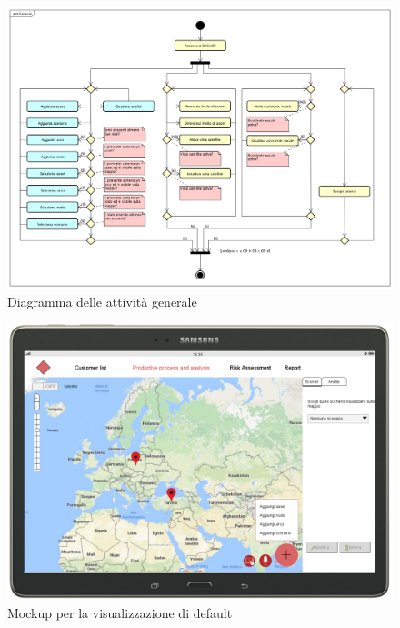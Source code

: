 \begin{figure}[H]
	\centering
	\includegraphics[width=\textwidth]{img/DiagrammiDiAttivita/GeneralActivities.png}
	\caption{Diagramma delle attività generale}
\end{figure}

\begin{figure}[H]
	\centering
	\includegraphics[width=\textwidth]{img/MockUp/m0.jpg}
	\caption{Mockup per la visualizzazione di default}
\end{figure}

\newpage
